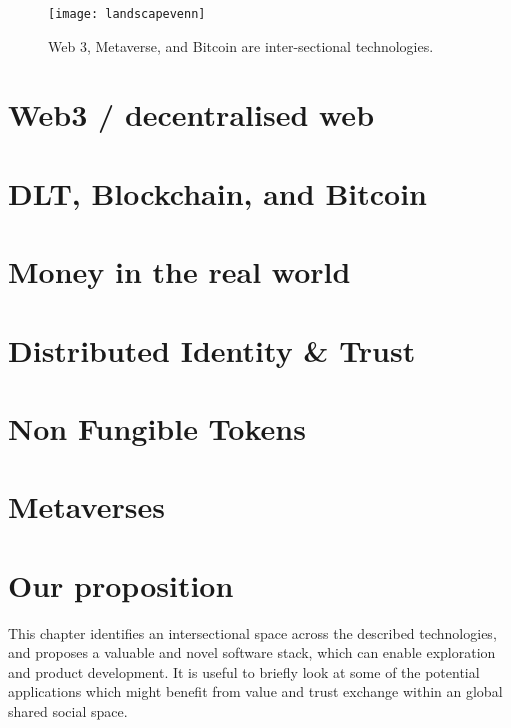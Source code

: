 \documentclass[
	12pt, %
	fleqn, %
	a4paper, %
	oneside, %
]{LegrandOrangeBook}
\begin{document}
\begin{figure*}[ht]\centering %
	\texttt{[image: landscapevenn]}
	\caption{Web 3, Metaverse, and Bitcoin are inter-sectional technologies.}
	\label{fig:landscapevenn}
\end{figure*}
\chapter{Web3 / decentralised web}


\chapter{DLT, Blockchain, and Bitcoin}


\chapter{Money in the real world}


%

\chapter{Distributed Identity \& Trust}


\chapter{Non Fungible Tokens}


\chapter{Metaverses}


\chapter{Our proposition}
This chapter identifies an intersectional space across the described technologies, and proposes a valuable and novel software stack, which can enable exploration  and product development. It is useful to briefly look at some of the potential applications which might benefit from value and trust exchange within an global shared social space.
\end{document}

